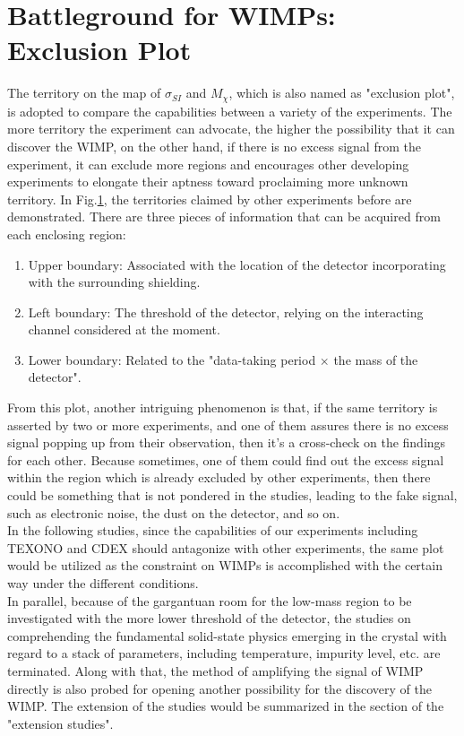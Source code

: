 \section{Battleground for WIMPs: Exclusion Plot}
The territory on the map of $\sigma_{SI}$ and $M_{\chi}$, which is also named as "exclusion plot", is adopted to compare the capabilities between a variety of the experiments. The more territory the experiment can advocate, the higher the possibility that it can discover the WIMP, on the other hand, if there is no excess signal from the experiment, it can exclude more regions and encourages other developing experiments to elongate their aptness toward proclaiming more unknown territory. In Fig.\ref{}, the territories claimed by other experiments before are demonstrated. There are three pieces of information that can be acquired from each enclosing region:\\
\begin{enumerate}
\item  Upper boundary: Associated with the location of the detector incorporating with the surrounding shielding.  
\item  Left boundary: The threshold of the detector, relying on the interacting channel considered at the moment.
\item  Lower boundary: Related to the "data-taking period $\times$ the mass of the detector".
\end{enumerate}
From this plot, another intriguing phenomenon is that, if the same territory is asserted by two or more experiments, and one of them assures there is no excess signal popping up from their observation, then it's a cross-check on the findings for each other. Because sometimes, one of them could find out the excess signal within the region which is already excluded by other experiments, then there could be something that is not pondered in the studies, leading to the fake signal, such as electronic noise, the dust on the detector, and so on.\\

In the following studies, since the capabilities of our experiments including TEXONO and CDEX should antagonize with other experiments, the same plot would be utilized as the constraint on WIMPs is accomplished with the certain way under the different conditions.\\

In parallel, because of the gargantuan room for the low-mass region to be investigated with the more lower threshold of the detector, the studies on comprehending the fundamental solid-state physics emerging in the crystal with regard to a stack of parameters, including temperature, impurity level, etc. are terminated. Along with that, the method of amplifying the signal of WIMP directly is also probed for opening another possibility for the discovery of the WIMP. The extension of the studies would be summarized in the section of the "extension studies". 

